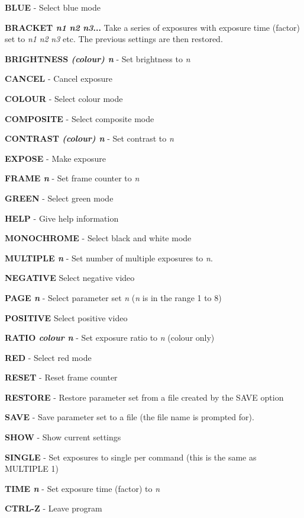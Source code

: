 \begin{list}{dummy}{}

\item[\bf BLUE] - Select blue mode
\item[\bf BRACKET {\em n1} {\em n2} {\em n3}...] Take a series of
exposures with exposure time (factor) set to {\em n1} {\em n2} {\em n3}
etc. The previous settings are then restored.
\item[\bf BRIGHTNESS {\em (colour) n}] - Set brightness to {\em n}
\item[\bf CANCEL] - Cancel exposure
\item[\bf COLOUR] - Select colour mode
\item[\bf COMPOSITE] - Select composite mode
\item[\bf CONTRAST {\em (colour) n}] - Set contrast to {\em n}
\item[\bf EXPOSE] - Make exposure
\item[\bf FRAME {\em n}] - Set frame counter to {\em n}
\item[\bf GREEN] - Select green mode
\item[\bf HELP] - Give help information
\item[\bf MONOCHROME] - Select black and white mode
\item[\bf MULTIPLE {\em n}] - Set number of multiple exposures to {\em
n}.
\item[\bf NEGATIVE] Select negative video
\item[\bf PAGE {\em n}] - Select parameter set {\em n} ({\em n} is in
the range 1 to 8)
\item[\bf POSITIVE] Select positive video
\item[\bf RATIO {\em colour n}] - Set exposure ratio  to {\em n}
(colour only)
\item[\bf RED] - Select red mode
\item[\bf RESET] - Reset frame counter
\item[\bf RESTORE] - Restore parameter set from a file created by the
SAVE option
\item[\bf SAVE] - Save parameter set to a file (the file name is
prompted for).
\item[\bf SHOW] - Show current settings
\item[\bf SINGLE] - Set exposures to single per command (this is the
same as MULTIPLE 1)
\item[\bf TIME {\em n}] - Set exposure time (factor) to {\em n}
\item[\bf CTRL-Z] - Leave program
\end{list}

